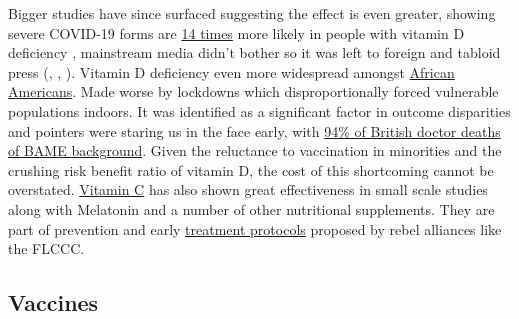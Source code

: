 \documentclass[11pt,a4paper,notitlepage]{report}
\begin{document}
Bigger studies have since surfaced suggesting the effect is even greater, showing severe COVID-19 forms are \href{https://journals.plos.org/plosone/article?id=10.1371/journal.pone.0263069}{14 times} more likely in people with vitamin D deficiency \cite{10.1371/journal.pone.0263069}, mainstream media didn't bother so it was left to foreign and tabloid press (\cite{timesofisrael03022022}, \cite{dailymail08022022}, \cite{hindustantimes14022022}). Vitamin D deficiency even more widespread amongst \href{https://www.everydayhealth.com/vitamin-d/does-vitamin-d-deficiency-pose-a-special-risk-for-black-people}{African Americans}. Made worse by lockdowns which disproportionally forced vulnerable populations indoors. It was identified as a significant factor in outcome disparities \cite{Ames2021-sf} and pointers were staring us in the face early, with \href{https://twitter.com/TheBMA/status/1271768163630428160?s=20}{94\% of British doctor deaths of BAME background}. Given the reluctance to vaccination in minorities and the crushing risk benefit ratio of vitamin D, the cost of this shortcoming cannot be overstated. \href{https://nutritionj.biomedcentral.com/articles/10.1186/s12937-021-00727-z}{Vitamin C} has also shown great effectiveness in small scale studies \cite{irriguible2021} along with Melatonin \cite{Cross2021-bl} and a number of other nutritional supplements. They are part of prevention and early \href{https://covid19criticalcare.com/wp-content/uploads/2020/11/FLCCC-Alliance-I-MASKplus-Protocol-ENGLISH.pdf}{treatment protocols} \cite{flccc-imask} proposed by rebel alliances like the FLCCC.







\subsection*{Vaccines}
\end{document}
